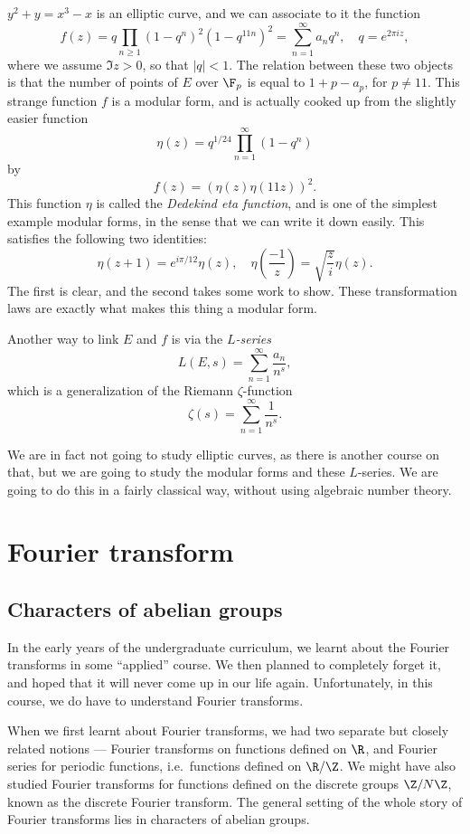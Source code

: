 \documentclass[a4paper]{article}
\begin{document}
\begin{eg}
  $y^2 + y = x^3 - x$ is an elliptic curve, and we can associate to it the function
  \[
    f(z) = q\prod_{n \geq 1} (1 - q^n)^2 (1 - q^{11n})^2 = \sum_{n = 1}^\infty a_n q^n,\quad q= e^{2\pi i z},
  \]
  where we assume $\Im z > 0$, so that $|q| < 1$. The relation between these two objects is that the number of points of $E$ over $\F_p$ is equal to $1 + p - a_p$, for $p \not= 11$. This strange function $f$ is a modular form, and is actually cooked up from the slightly easier function
  \[
    \eta(z) = q^{1/24} \prod_{n = 1}^\infty (1 - q^n)
  \]
  by
  \[
    f(z) = (\eta(z)\eta(11z))^2.
  \]
  This function $\eta$ is called the \emph{Dedekind eta function}, and is one of the simplest example modular forms, in the sense that we can write it down easily. This satisfies the following two identities:
  \[
    \eta(z + 1) = e^{i \pi/12}\eta(z),\quad \eta\left(\frac{-1}{z}\right) = \sqrt{\frac{z}{i}} \eta(z).
  \]
  The first is clear, and the second takes some work to show. These transformation laws are exactly what makes this thing a modular form.

  Another way to link $E$ and $f$ is via the \emph{$L$-series}
  \[
    L(E, s) = \sum_{n = 1}^\infty \frac{a_n}{n^s},
  \]
  which is a generalization of the Riemann $\zeta$-function
  \[
    \zeta(s) = \sum_{n = 1}^\infty \frac{1}{n^s}.
  \]
\end{eg}
We are in fact not going to study elliptic curves, as there is another course on that, but we are going to study the modular forms and these $L$-series. We are going to do this in a fairly classical way, without using algebraic number theory.

\section{Fourier transform}
\subsection{Characters of abelian groups}
In the early years of the undergraduate curriculum, we learnt about the Fourier transforms in some ``applied'' course. We then planned to completely forget it, and hoped that it will never come up in our life again. Unfortunately, in this course, we do have to understand Fourier transforms.

When we first learnt about Fourier transforms, we had two separate but closely related notions --- Fourier transforms on functions defined on $\R$, and Fourier series for periodic functions, i.e.\ functions defined on $\R/\Z$. We might have also studied Fourier transforms for functions defined on the discrete groups $\Z/N\Z$, known as the discrete Fourier transform. The general setting of the whole story of Fourier transforms lies in characters of abelian groups.
\end{document}
